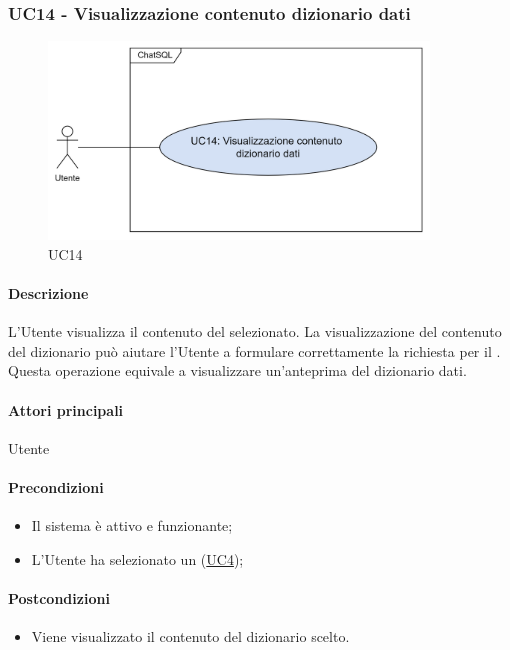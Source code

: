 \subsubsection{UC14 - Visualizzazione contenuto dizionario dati}\label{UC14}

\begin{figure}[H]
  \centering
  \includegraphics[width=0.90\textwidth]{assets/uc14.png}
  \caption{UC14}
\end{figure}

\paragraph*{Descrizione}
L'Utente visualizza il contenuto del  selezionato. La visualizzazione del contenuto del dizionario può aiutare l'Utente a formulare correttamente la richiesta per il . Questa operazione equivale a visualizzare un'anteprima del dizionario dati.

\paragraph*{Attori principali}
Utente

\paragraph*{Precondizioni}
\begin{itemize}
  \item Il sistema è attivo e funzionante;
  \item L'Utente ha selezionato un  (\hyperref[UC4]{UC4});
\end{itemize}

\paragraph*{Postcondizioni}
\begin{itemize}
  \item Viene visualizzato il contenuto del dizionario scelto.
\end{itemize}

